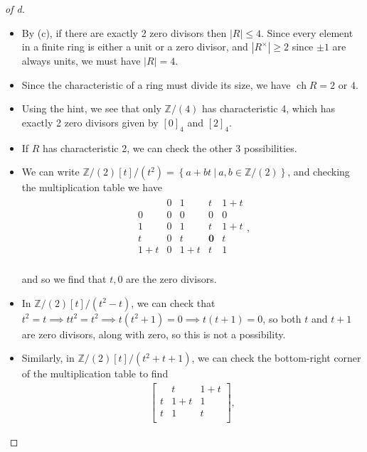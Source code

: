 \begin{solution}
\begin{proof}[of d]
\begin{itemize}
\item
  By (c), if there are exactly 2 zero divisors then
  \({\left\lvert {R} \right\rvert} \leq 4\). Since every element in a
  finite ring is either a unit or a zero divisor, and
  \({\left\lvert {R^{\times}} \right\rvert} \geq 2\) since \(\pm 1\) are
  always units, we must have \({\left\lvert {R} \right\rvert} = 4\).
\item
  Since the characteristic of a ring must divide its size, we have
  \(\operatorname{ch}R = 2\) or \(4\).
\item
  Using the hint, we see that only \({\mathbb{Z}}/(4)\) has
  characteristic 4, which has exactly 2 zero divisors given by \([0]_4\)
  and \([2]_4\).
\item
  If \(R\) has characteristic 2, we can check the other 3 possibilities.
\item
  We can write
  \({\mathbb{Z}}/(2)[t]/(t^2) = \left\{{a + bt {~\mathrel{\Big|}~}a,b\in {\mathbb{Z}}/(2)}\right\}\),
  and checking the multiplication table we have
  \begin{align*}
  \begin{array}{c|cccc}
            & 0 & 1     & t & 1+t   \\ \hline
  0       & 0 & 0     & 0 & 0     \\ 
  1       & 0 & 1     & t & 1+t   \\ 
  t       & 0 & t     & \mathbf{0} & t    \\ 
  1 + t & 0 & 1+t & t & 1     \\ 
  \end{array}
  ,\end{align*}

  and so we find that \(t, 0\) are the zero divisors.
\item
  In \({\mathbb{Z}}/(2)[t]/(t^2 - t)\), we can check that
  \(t^2 = t \implies t t^2 = t^2 \implies t(t^2 + 1) = 0 \implies t(t+1) = 0\),
  so both \(t\) and \(t+1\) are zero divisors, along with zero, so this
  is not a possibility.
\item
  Similarly, in \({\mathbb{Z}}/(2)[t]/(t^2 + t + 1)\), we can check the
  bottom-right corner of the multiplication table to find
  \begin{align*}
  \left[\begin{array}{c|cc}
    & t     & 1 +t \\ \hline
  t & 1+t & 1 \\
  t & 1   & t \\
  \end{array}\right]
  ,\end{align*}


\end{itemize}
\end{proof}
\end{solution}
